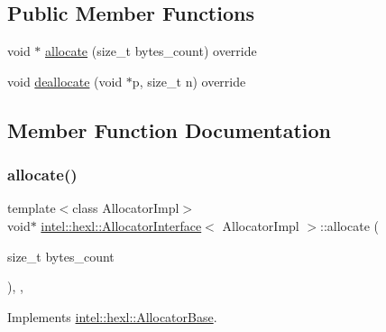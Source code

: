 \subsection*{Public Member Functions}
\begin{DoxyCompactItemize}
\item 
void $\ast$ \hyperlink{structintel_1_1hexl_1_1AllocatorInterface_a02d2d7918ea916fce443ba2f5dbaa8d1}{allocate} (size\+\_\+t bytes\+\_\+count) override
\item 
void \hyperlink{structintel_1_1hexl_1_1AllocatorInterface_a2684feec3b8f3cfba626b46912b4cec5}{deallocate} (void $\ast$p, size\+\_\+t n) override
\end{DoxyCompactItemize}


\subsection{Member Function Documentation}
\mbox{\label{structintel_1_1hexl_1_1AllocatorInterface_a02d2d7918ea916fce443ba2f5dbaa8d1}} 
\subsubsection{\texorpdfstring{allocate()}{allocate()}}
{\footnotesize\ttfamily template$<$class Allocator\+Impl$>$ \\
void$\ast$ \hyperlink{structintel_1_1hexl_1_1AllocatorInterface}{intel\+::hexl\+::\+Allocator\+Interface}$<$ Allocator\+Impl $>$\+::allocate (\begin{DoxyParamCaption}\item[{size\+\_\+t}]{bytes\+\_\+count }\end{DoxyParamCaption})\hspace{0.3cm}{\ttfamily [inline]}, {\ttfamily [override]}, {\ttfamily [virtual]}}



Implements \hyperlink{structintel_1_1hexl_1_1AllocatorBase_aadf587e7617fbace2e9d3b4f9d9e8af0}{intel\+::hexl\+::\+Allocator\+Base}.

\mbox{\label{structintel_1_1hexl_1_1AllocatorInterface_a2684feec3b8f3cfba626b46912b4cec5}} 
